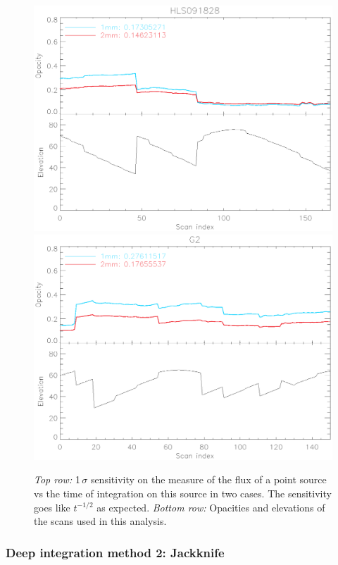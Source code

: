 \begin{figure}
\begin{center}
\includegraphics[clip, angle=0, scale =0.4]{Figures/hls_opacity_and_elev.eps}
\includegraphics[clip, angle=0, scale =0.4]{Figures/g2_opacity_and_elev.eps}
\caption[NEFD vs time]{\emph{Top row:} 1\,$\sigma$ sensitivity on the
  measure of the flux of a point source vs the time of integration on this
  source in two cases. The sensitivity goes like $t^{-1/2}$ as
  expected. \emph{Bottom row:} Opacities and elevations of the scans used in
  this analysis.}
\label{fig:nefd_plots}
\end{center}
\end{figure}

\subsubsection{Deep integration method 2: Jackknife}


